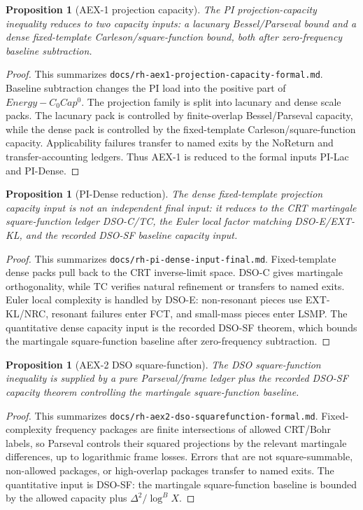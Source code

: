 \documentclass[11pt]{article}
\newtheorem{proposition}[theorem]{Proposition}
\theoremstyle{definition}
\begin{document}
\begin{proposition}[AEX-1 projection capacity]
The PI projection-capacity inequality reduces to two capacity inputs: a lacunary Bessel/Parseval bound and a dense fixed-template Carleson/square-function bound, both after zero-frequency baseline subtraction.
\end{proposition}
\begin{proof}
This summarizes \texttt{docs/rh-aex1-projection-capacity-formal.md}.  Baseline subtraction changes the PI load into the positive part of $Energy-C_0Cap^0$.  The projection family is split into lacunary and dense scale packs.  The lacunary pack is controlled by finite-overlap Bessel/Parseval capacity, while the dense pack is controlled by the fixed-template Carleson/square-function capacity.  Applicability failures transfer to named exits by the NoReturn and transfer-accounting ledgers.  Thus AEX-1 is reduced to the formal inputs PI-Lac and PI-Dense.
\end{proof}



\begin{proposition}[PI-Dense reduction]
The dense fixed-template projection capacity input is not an independent final input: it reduces to the CRT martingale square-function ledger DSO-C/TC, the Euler local factor matching DSO-E/EXT-KL, and the recorded DSO-SF baseline capacity input.
\end{proposition}
\begin{proof}
This summarizes \texttt{docs/rh-pi-dense-input-final.md}.  Fixed-template dense packs pull back to the CRT inverse-limit space.  DSO-C gives martingale orthogonality, while TC verifies natural refinement or transfers to named exits.  Euler local complexity is handled by DSO-E: non-resonant pieces use EXT-KL/NRC, resonant failures enter FCT, and small-mass pieces enter LSMP.  The quantitative dense capacity input is the recorded DSO-SF theorem, which bounds the martingale square-function baseline after zero-frequency subtraction.
\end{proof}

\begin{proposition}[AEX-2 DSO square-function]
The DSO square-function inequality is supplied by a pure Parseval/frame ledger plus the recorded DSO-SF capacity theorem controlling the martingale square-function baseline.
\end{proposition}
\begin{proof}
This summarizes \texttt{docs/rh-aex2-dso-squarefunction-formal.md}.  Fixed-complexity frequency packages are finite intersections of allowed CRT/Bohr labels, so Parseval controls their squared projections by the relevant martingale differences, up to logarithmic frame losses.  Errors that are not square-summable, non-allowed packages, or high-overlap packages transfer to named exits.  The quantitative input is DSO-SF: the martingale square-function baseline is bounded by the allowed capacity plus $\Delta^2/\log^B X$.
\end{proof}
\end{document}
